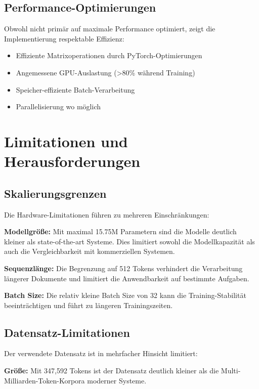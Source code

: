 \subsection{Performance-Optimierungen}

Obwohl nicht primär auf maximale Performance optimiert, zeigt die Implementierung respektable Effizienz:
\begin{itemize}
    \item Effiziente Matrixoperationen durch PyTorch-Optimierungen
    \item Angemessene GPU-Auslastung (>80\% während Training)
    \item Speicher-effiziente Batch-Verarbeitung
    \item Parallelisierung wo möglich
\end{itemize}

\section{Limitationen und Herausforderungen}

\subsection{Skalierungsgrenzen}

Die Hardware-Limitationen führen zu mehreren Einschränkungen:

\textbf{Modellgröße:} Mit maximal 15.75M Parametern sind die Modelle deutlich kleiner als state-of-the-art Systeme. Dies limitiert sowohl die Modellkapazität als auch die Vergleichbarkeit mit kommerziellen Systemen.

\textbf{Sequenzlänge:} Die Begrenzung auf 512 Tokens verhindert die Verarbeitung längerer Dokumente und limitiert die Anwendbarkeit auf bestimmte Aufgaben.

\textbf{Batch Size:} Die relativ kleine Batch Size von 32 kann die Training-Stabilität beeinträchtigen und führt zu längeren Trainingszeiten.

\subsection{Datensatz-Limitationen}

Der verwendete Datensatz ist in mehrfacher Hinsicht limitiert:

\textbf{Größe:} Mit 347,592 Tokens ist der Datensatz deutlich kleiner als die Multi-Milliarden-Token-Korpora moderner Systeme.

